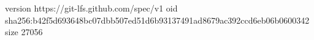 version https://git-lfs.github.com/spec/v1
oid sha256:b42f5d693648bc07dbb507ed51d6b93137491ad8679ac392ccd6eb06b0600342
size 27056
